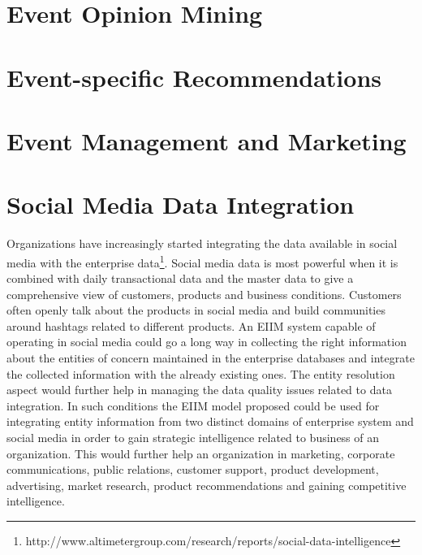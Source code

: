 \section{Event Opinion Mining}

\section{Event-specific Recommendations}

\section{Event Management and Marketing}

\section{Social Media Data Integration}
Organizations have increasingly started integrating the data available in social media with the enterprise data\footnote{http://www.altimetergroup.com/research/reports/social-data-intelligence}. Social media data is most powerful when it is combined with daily transactional data and the master data to give a comprehensive view of customers, products and business conditions. Customers often openly talk about the products in social media and build communities around hashtags related to different products. An EIIM system capable of operating in social media could go a long way in collecting the right information about the entities of concern maintained in the enterprise databases and integrate the collected information with the already existing ones. The entity resolution aspect would further help in managing the data quality issues related to data integration. In such conditions the EIIM model proposed could be used for integrating entity information from two distinct domains of enterprise system and social media in order to gain strategic intelligence related to business of an organization. This would further help an organization in marketing, corporate communications, public relations, customer support, product development, advertising, market research, product recommendations and gaining competitive intelligence.
